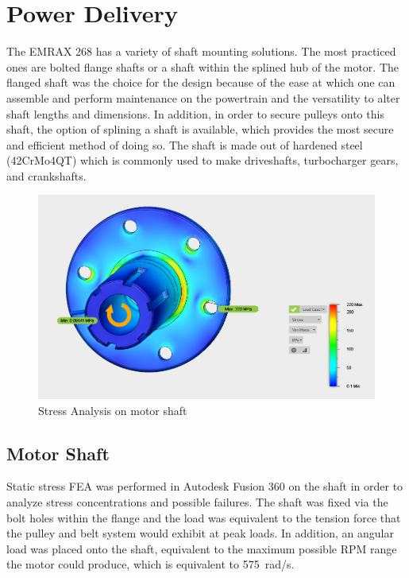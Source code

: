 \documentclass[main.tex]{subfiles}
\begin{document}
    \section{Power Delivery}
    The EMRAX 268 has a variety of shaft mounting solutions. The most practiced ones are bolted flange shafts or a shaft within the splined hub of the motor. The flanged shaft was the choice for the design because of the ease at which one can assemble and perform maintenance on the powertrain and the versatility to alter shaft lengths and dimensions. In addition, in order to secure pulleys onto this shaft, the option of splining a shaft is available, which provides the most secure and efficient method of doing so. The shaft is made out of hardened steel (42CrMo4QT) which is commonly used to make driveshafts, turbocharger gears, and crankshafts.\\

    \begin{figure}[H]
        \centering
        \includegraphics[width=\linewidth]{images/fig12}
        \caption{Stress Analysis on motor shaft}
    \end{figure}
    \subsection{Motor Shaft}

    Static stress FEA was performed in Autodesk Fusion 360 on the shaft in order to analyze stress concentrations and possible failures. The shaft was fixed via the bolt holes within the flange and the load was equivalent to the tension force that the pulley and belt system would exhibit at peak loads. In addition, an angular load was placed onto the shaft, equivalent to the maximum possible RPM range the motor could produce, which is equivalent to \SI{575}{rad/s}.\\
\end{document}
